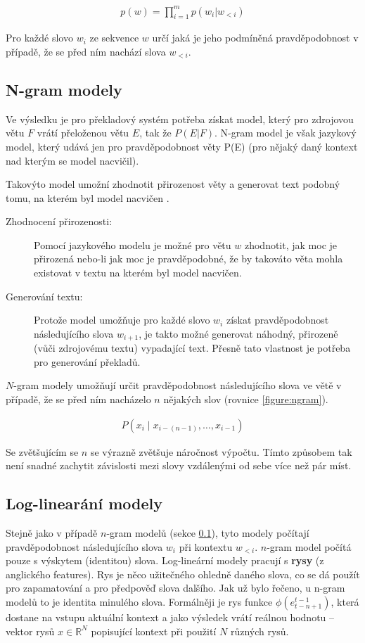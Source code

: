 \begin{align}\label{figure:probdistr}
  p(w) = \prod_{i=1}^{m} p(w_i|w_{<i})
\end{align}

Pro každé slovo $w_i$ ze sekvence $w$ určí jaká je jeho podmíněná pravděpodobnost v případě, že se před ním nachází slova $w_{<i}$.

\subsection{N-gram modely}\label{subsection:ngram}
Ve výsledku je pro překladový systém potřeba získat model, který pro zdrojovou větu $F$ vrátí přeloženou větu $E$, tak že $P(E|F)$. N-gram model je však jazykový model, který udává jen pro pravděpodobnost věty P(E) (pro nějaký daný kontext nad kterým se model nacvičil).

Takovýto model umožní zhodnotit přirozenost věty a generovat text podobný tomu, na kterém byl model nacvičen \cite{nmtTutorial}.

\begin{description}
  \item[Zhodnocení přirozenosti:] Pomocí jazykového modelu je možné pro větu $w$ zhodnotit, jak moc je přirozená nebo-li jak moc je pravděpodobné, že by takováto věta mohla existovat v textu na kterém byl model nacvičen.
  \item[Generování textu:] Protože model umožňuje pro každé slovo $w_i$ získat pravděpodobnost následujícího slova $w_{i+1}$, je takto možné generovat náhodný, přirozeně (vůči zdrojovému textu) vypadající text. Přesně tato vlastnost je potřeba pro generování překladů.
\end{description}

$N$-gram modely umožňují určit pravděpodobnost následujícího slova ve větě v případě, že se před ním nacházelo $n$ nějakých slov (rovnice \ref{figure:ngram}).

\begin{align}\label{figure:ngram}
    P(x_{i}\mid x_{{i-(n-1)}},\dots ,x_{{i-1}})
\end{align}

Se zvětšujícím se $n$ se výrazně zvětšuje náročnost výpočtu. Tímto způsobem tak není snadné zachytit závislosti mezi slovy vzdálenými od sebe více než pár míst.

\subsection{Log-linearání modely} \label{subsection:loglinear}
Stejně jako v případě $n$-gram modelů (sekce \ref{subsection:ngram}), tyto modely počítají pravděpodobnost následujícího slova $w_i$ při kontextu $w_{<i}$. $n$-gram model počítá pouze s výskytem (identitou) slova. Log-lineární modely pracují s \textbf{rysy} (z anglického features). Rys je něco užitečného ohledně daného slova, co se dá použít pro zapamatování a pro předpověď slova dalšího. Jak už bylo řečeno, u n-gram modelů to je identita minulého slova. Formálněji je rys funkce $\phi(e^{t-1}_{t-n+1})$, která dostane na vstupu aktuální kontext a jako výsledek vrátí reálnou hodnotu -- vektor rysů $x \in \mathbb{R}^N$ popisující kontext při použití $N$ různých rysů.

